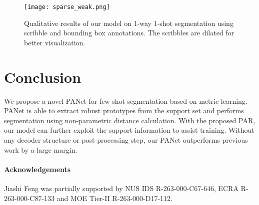\documentclass[10pt,twocolumn,letterpaper]{article}
\begin{document}
\begin{figure}[t!]
\begin{center}
   \texttt{[image: sparse\_weak.png]}
\end{center}
   \caption{Qualitative results of our model on 1-way 1-shot segmentation using scribble and bounding box annotations. The scribbles are dilated for better visualization.}
\label{fig:sparse}
\end{figure}


\section{Conclusion}
We propose a novel PANet for few-shot segmentation based on metric learning. PANet is able to extract robust prototypes from the support set and performs segmentation using non-parametric distance calculation. With the proposed PAR, our model can further exploit the support information to assist training. Without any decoder structure or post-processing step, our PANet outperforms previous work by a large margin.

\vspace{-5pt}
\paragraph{Acknowledgements} Jiashi Feng was partially supported by NUS IDS R-263-000-C67-646,  ECRA R-263-000-C87-133 and MOE Tier-II R-263-000-D17-112.



{\small


}
\end{document}
